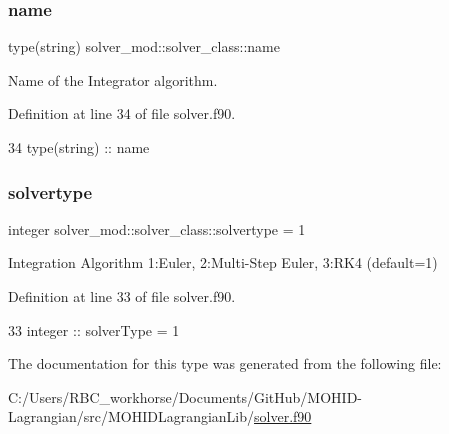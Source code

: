 \subsubsection{\texorpdfstring{name}{name}}
{\footnotesize\ttfamily type(string) solver\+\_\+mod\+::solver\+\_\+class\+::name\hspace{0.3cm}{\ttfamily [private]}}



Name of the Integrator algorithm. 



Definition at line 34 of file solver.\+f90.


\begin{DoxyCode}
34         \textcolor{keywordtype}{type}(string) :: name
\end{DoxyCode}
\mbox{\label{structsolver__mod_1_1solver__class_a6bd9eec5b3a11d34981b191b54944ac4}} 
\subsubsection{\texorpdfstring{solvertype}{solvertype}}
{\footnotesize\ttfamily integer solver\+\_\+mod\+::solver\+\_\+class\+::solvertype = 1\hspace{0.3cm}{\ttfamily [private]}}



Integration Algorithm 1\+:Euler, 2\+:Multi-\/\+Step Euler, 3\+:R\+K4 (default=1) 



Definition at line 33 of file solver.\+f90.


\begin{DoxyCode}
33         \textcolor{keywordtype}{integer} :: solverType = 1
\end{DoxyCode}


The documentation for this type was generated from the following file\+:\begin{DoxyCompactItemize}
\item 
C\+:/\+Users/\+R\+B\+C\+\_\+workhorse/\+Documents/\+Git\+Hub/\+M\+O\+H\+I\+D-\/\+Lagrangian/src/\+M\+O\+H\+I\+D\+Lagrangian\+Lib/\mbox{\hyperlink{solver_8f90}{solver.\+f90}}\end{DoxyCompactItemize}
